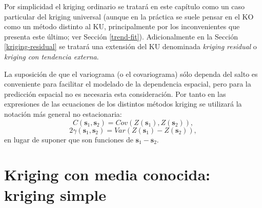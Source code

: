 \documentclass[
]{book}
\theoremstyle{break}
\theoremstyle{definition}
\theoremstyle{definition}
\theoremstyle{definition}
\theoremstyle{definition}
\theoremstyle{remark}
\begin{document}
Por simplicidad el kriging ordinario se tratará en este capítulo como un caso particular del kriging universal (aunque en la práctica se suele pensar en el KO como un método distinto al KU, principalmente por los inconvenientes que presenta este último; ver Sección \ref{trend-fit}).
Adicionalmente en la Sección \ref{kriging-residual} se tratará una extensión del KU denominada \emph{kriging residual} o \emph{kriging con tendencia externa}.

La suposición de que el variograma (o el covariograma) sólo dependa del salto es conveniente para facilitar el modelado de la dependencia espacial, pero para la predicción espacial no es necesaria esta consideración.
Por tanto en las expresiones de las ecuaciones de los distintos métodos kriging se utilizará la notación más general no estacionaria:
\[C(\mathbf{s}_{1}, \mathbf{s}_{2}) = Cov(Z(\mathbf{s}_{1}), Z(\mathbf{s}_{2})),\]
\[2\gamma(\mathbf{s}_{1}, \mathbf{s}_{2}) = Var(Z(\mathbf{s}_{1}) - Z(\mathbf{s}_{2})),\]
en lugar de suponer que son funciones de \(\mathbf{s}_{1}-\mathbf{s}_{2}\).

\section{Kriging con media conocida: kriging simple}\label{ksimple}
\end{document}

